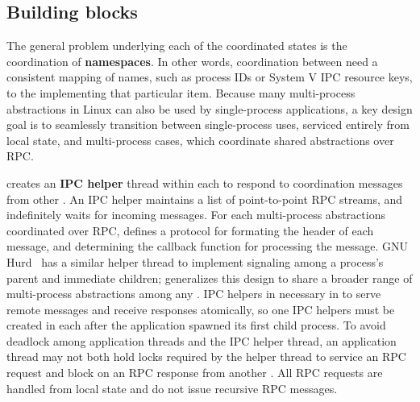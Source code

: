 \subsection{Building blocks}
\label{sec:libos:namespaces:building-blocks}

The general problem underlying each of the coordinated \libos{} states is 
the coordination of {\bf namespaces}.  In other words, coordination between \picoprocs{} need 
a consistent mapping of names, such as process IDs or System V IPC resource keys, 
to the \picoproc{} implementing that particular item.  
Because many multi-process abstractions in Linux can also be used by single-process applications,
a key design goal is to seamlessly transition between single-process uses, serviced 
entirely from local \libos{} state, and multi-process cases, which coordinate shared abstractions over RPC.


\thelibos{} creates an {\bf IPC helper} thread within each \picoproc{}
to respond to coordination messages from other \picoprocs{}. 
An IPC helper
maintains a list of point-to-point RPC streams, and indefinitely waits for incoming messages.
For each multi-process abstractions coordinated over RPC,
\thelibos{} defines a protocol for formating the header of each message,
and determining the callback function for processing the message.
GNU Hurd~\cite{hurd} has a similar helper thread to implement signaling among a process's parent and
immediate children;
\graphene{} generalizes this design to share a broader range of multi-process abstractions among any \picoprocs{}.
IPC helpers in necessary 
in \thelibos{} to serve remote messages and receive responses atomically,
so one IPC helpers must be created in each \picoproc{}
after the application spawned its first child process.
To avoid deadlock among application threads and the IPC helper thread, 
an application thread may not both hold locks required by the helper thread to service an RPC request
and block on an RPC response from another \picoproc{}.
All RPC requests are handled from local state and do not issue recursive RPC messages.%

